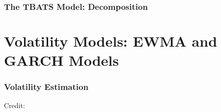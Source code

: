 \documentclass{beamer}
\begin{document}
    \begin{frame}
      \frametitle{The TBATS Model: Decomposition}
    \end{frame}


\section{Volatility Models: EWMA and GARCH Models}


\begin{frame}
  \frametitle{Volatility Estimation}
  \hspace*{15pt}\hbox{\scriptsize Credit:}          
  
\end{frame}
\end{document}
